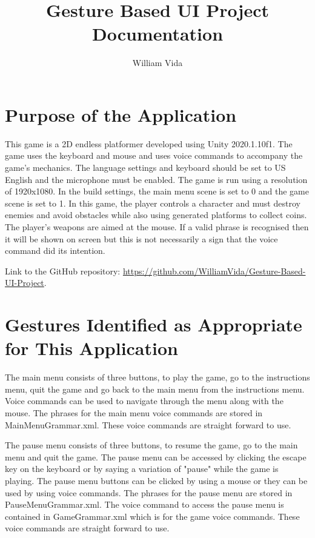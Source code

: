 \documentclass{article}
\title{Gesture Based UI Project Documentation}
\author{William Vida}
\date{}
\begin{document}
\maketitle

\tableofcontents

\newpage

\section{Purpose of the Application}
This game is a 2D endless platformer developed using Unity 2020.1.10f1. The game uses the keyboard and mouse and uses voice commands to accompany the game's mechanics. The language settings and keyboard should be set to US English and the microphone must be enabled. The game is run using a resolution of 1920x1080. In the build settings, the main menu scene is set to 0 and the game scene is set to 1. In this game, the player controls a character and must destroy enemies and avoid obstacles while also using generated platforms to collect coins. The player's weapons are aimed at the mouse. If a valid phrase is recognised then it will be shown on screen but this is not necessarily a sign that the voice command did its intention.

Link to the GitHub repository: \url{https://github.com/WilliamVida/Gesture-Based-UI-Project}.

\section{Gestures Identified as Appropriate for This Application}
The main menu consists of three buttons, to play the game, go to the instructions menu, quit the game and go back to the main menu from the instructions menu. Voice commands can be used to navigate through the menu along with the mouse. The phrases for the main menu voice commands are stored in MainMenuGrammar.xml. These voice commands are straight forward to use.

The pause menu consists of three buttons, to resume the game, go to the main menu and quit the game. The pause menu can be accessed by clicking the escape key on the keyboard or by saying a variation of "pause" while the game is playing. The pause menu buttons can be clicked by using a mouse or they can be used by using voice commands. The phrases for the pause menu are stored in PauseMenuGrammar.xml. The voice command to access the pause menu is contained in GameGrammar.xml which is for the game voice commands. These voice commands are straight forward to use.
\end{document}
